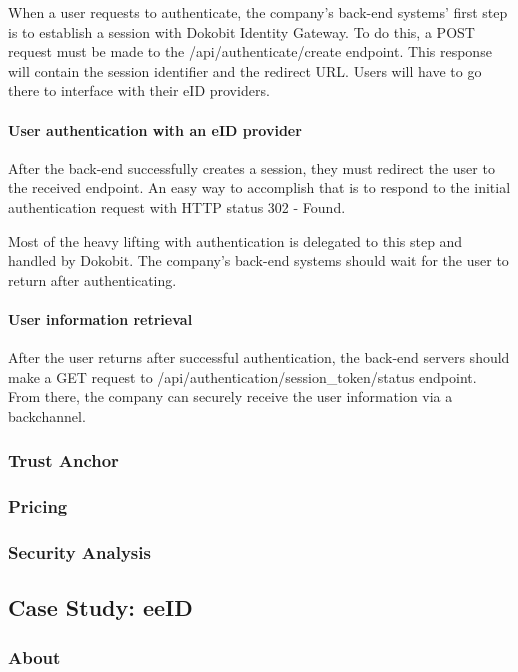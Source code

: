 When a user requests to authenticate, the company's back-end systems' first step is to establish a session with Dokobit Identity Gateway. To do this, a {POST} request must be made to the {/api/authenticate/create} endpoint. This response will contain the session identifier and the redirect URL. Users will have to go there to interface with their eID providers.

\paragraph{User authentication with an eID provider}

After the back-end successfully creates a session, they must redirect the user to the received endpoint. An easy way to accomplish that is to respond to the initial authentication request with HTTP status 302 - Found.

Most of the heavy lifting with authentication is delegated to this step and handled by Dokobit. The company's back-end systems should wait for the user to return after authenticating.

\paragraph{User information retrieval}

After the user returns after successful authentication, the back-end servers should make a {GET} request to {/api/authentication/session\_token/status} endpoint. From there, the company can securely receive the user information via a backchannel.

\subsubsection{Trust Anchor}


\subsubsection{Pricing}
\subsubsection{Security Analysis}

\subsection{Case Study: eeID}

\subsubsection{About}

